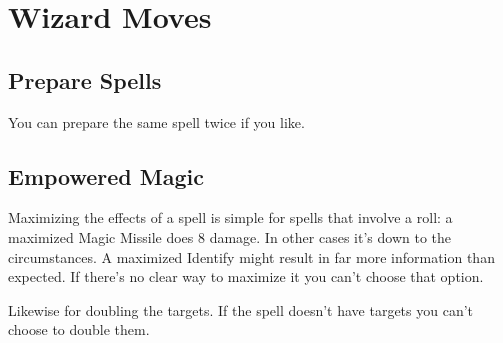 \chapter{Wizard Moves}
   
 
\section{Prepare Spells}    
 

You can prepare the same spell twice if you like.

 
\section{Empowered Magic}    
 

Maximizing the effects of a spell is simple for spells that involve a roll: a maximized Magic Missile does 8 damage. In other cases it's down to the circumstances. A maximized Identify might result in far more information than expected. If there's no clear way to maximize it you can't choose that option.

 

Likewise for doubling the targets. If the spell doesn't have targets you can't choose to double them.

 
